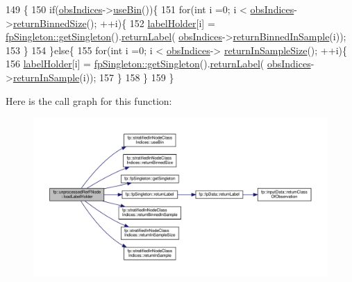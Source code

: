 \begin{DoxyCode}
149                                              \{
150                     \textcolor{keywordflow}{if}(\hyperlink{classfp_1_1unprocessedRerFNode_ad52d9d508bf378bc793b8cf961163735}{obsIndices}->\hyperlink{classfp_1_1stratifiedInNodeClassIndices_af740a8054cefe977f8f1288fc6b39109}{useBin}())\{
151                         \textcolor{keywordflow}{for}(\textcolor{keywordtype}{int} i =0; i < \hyperlink{classfp_1_1unprocessedRerFNode_ad52d9d508bf378bc793b8cf961163735}{obsIndices}->\hyperlink{classfp_1_1stratifiedInNodeClassIndices_a9f77fe5e638170c4ad4ce99541561cfc}{returnBinnedSize}(); ++i)\{
152                             \hyperlink{classfp_1_1unprocessedRerFNode_a9e1a9728861a19034c9b17d5eaa2891d}{labelHolder}[i] = 
      \hyperlink{classfp_1_1fpSingleton_a8bdae77b68521003e3fc630edec2e240}{fpSingleton::getSingleton}().\hyperlink{classfp_1_1fpSingleton_aa2f644b1521948fb994f4087ddfaea14}{returnLabel}(
      \hyperlink{classfp_1_1unprocessedRerFNode_ad52d9d508bf378bc793b8cf961163735}{obsIndices}->\hyperlink{classfp_1_1stratifiedInNodeClassIndices_a775d9a820b6f48ab44cd1ac4ffde1578}{returnBinnedInSample}(i));
153                         \}
154                     \}\textcolor{keywordflow}{else}\{
155                         \textcolor{keywordflow}{for}(\textcolor{keywordtype}{int} i =0; i < \hyperlink{classfp_1_1unprocessedRerFNode_ad52d9d508bf378bc793b8cf961163735}{obsIndices}->
      \hyperlink{classfp_1_1stratifiedInNodeClassIndices_a596235ffec7250fabd2818d395b39c66}{returnInSampleSize}(); ++i)\{
156                             \hyperlink{classfp_1_1unprocessedRerFNode_a9e1a9728861a19034c9b17d5eaa2891d}{labelHolder}[i] = 
      \hyperlink{classfp_1_1fpSingleton_a8bdae77b68521003e3fc630edec2e240}{fpSingleton::getSingleton}().\hyperlink{classfp_1_1fpSingleton_aa2f644b1521948fb994f4087ddfaea14}{returnLabel}(
      \hyperlink{classfp_1_1unprocessedRerFNode_ad52d9d508bf378bc793b8cf961163735}{obsIndices}->\hyperlink{classfp_1_1stratifiedInNodeClassIndices_a2d7e802fb97db0367bb8e8f31d393afd}{returnInSample}(i));
157                         \}
158                     \}
159                 \}
\end{DoxyCode}
Here is the call graph for this function\+:
\nopagebreak
\begin{figure}[H]
\begin{center}
\leavevmode
\includegraphics[width=350pt]{classfp_1_1unprocessedRerFNode_ad4ed23c3eecd133c0f194b94d7e75404_cgraph}
\end{center}
\end{figure}
